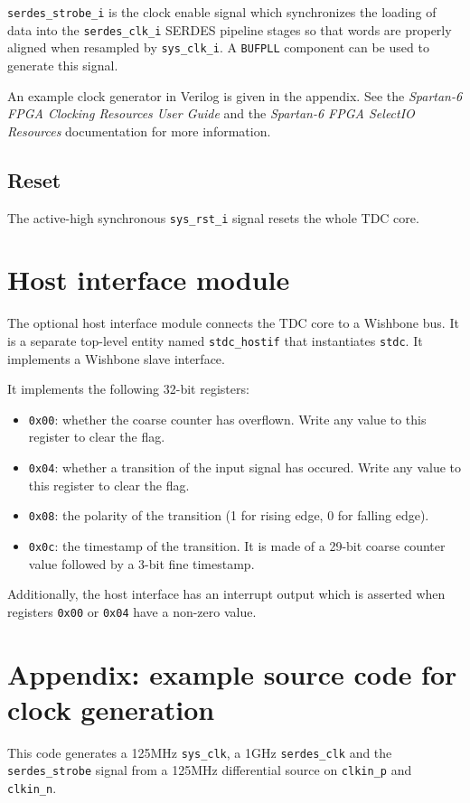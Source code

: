 \documentclass[a4paper,11pt]{article}
\begin{document}
\verb!serdes_strobe_i! is the clock enable signal which synchronizes the loading of data into the \verb!serdes_clk_i! SERDES pipeline stages so that words are properly aligned when resampled by \verb!sys_clk_i!. A \verb!BUFPLL! component can be used to generate this signal.

An example clock generator in Verilog is given in the appendix. See the \textit{Spartan-6 FPGA Clocking Resources User Guide} and the \textit{Spartan-6 FPGA SelectIO Resources} documentation for more information.

\subsection{Reset}
The active-high synchronous \verb!sys_rst_i! signal resets the whole TDC core.

\section{Host interface module}
The optional host interface module connects the TDC core to a Wishbone bus.
It is a separate top-level entity named \verb!stdc_hostif! that instantiates \verb!stdc!. It implements a Wishbone slave interface.

It implements the following 32-bit registers:
\begin{itemize}
\item \verb!0x00!: whether the coarse counter has overflown. Write any value to this register to clear the flag.
\item \verb!0x04!: whether a transition of the input signal has occured. Write any value to this register to clear the flag.
\item \verb!0x08!: the polarity of the transition (1 for rising edge, 0 for falling edge).
\item \verb!0x0c!: the timestamp of the transition. It is made of a 29-bit coarse counter value followed by a 3-bit fine timestamp.
\end{itemize}

Additionally, the host interface has an interrupt output which is asserted when registers \verb!0x00! or \verb!0x04! have a non-zero value.

\pagebreak

\section*{Appendix: example source code for clock generation}
This code generates a 125MHz \verb!sys_clk!, a 1GHz \verb!serdes_clk! and the \verb!serdes_strobe! signal from a 125MHz differential source on \verb!clkin_p! and \verb!clkin_n!.
\end{document}
